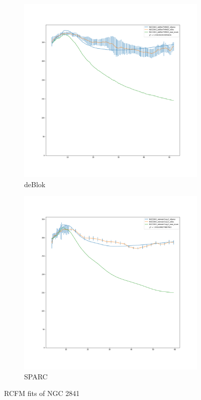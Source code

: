 \documentclass[reprint,%
 amsmath,amssymb,
 aps,
]{revtex4-1}
\begin{document}
  \begin{figure}[h]
\begin{subfigure}{.5\textwidth}
  \centering
  \includegraphics[width=.8\linewidth]{NGC2841_deBlokTHINGS_XueSofue}
  \caption{deBlok\cite{Blok1}}
  \label{fig:sfig9}
\end{subfigure}%
\begin{subfigure}{.5\textwidth}
  \centering
  \includegraphics[width=.8\linewidth]{NGC2841_rotmod-Copy1_XueSofue}
  \caption{SPARC\cite{2016Lelli}}
  \label{fig:sfig10}
\end{subfigure}
\caption{RCFM fits  of NGC 2841}
\label{fig:fig2841}
\end{figure}
\end{document}

